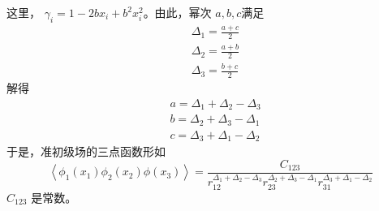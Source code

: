这里， $\gamma_{i}=1-2 b x_{i}+b^{2} x_{i}^{2} $。由此，幂次 $a,b,c $满足
\begin{align} &\Delta_{1}=\frac{a+c}{2}\\ &\Delta_{2}=\frac{a+b}{2}\\ &\Delta_{3}=\frac{b+c}{2} \end{align}
解得
\begin{align} &a=\Delta_{1}+\Delta_{2}-\Delta_{3}\\ &b=\Delta_{2}+\Delta_{3}-\Delta_{1}\\ &c=\Delta_{3}+\Delta_{1}-\Delta_{2}\end{align}
于是，准初级场的三点函数形如
\begin{equation}
	\left\langle\phi_{1}\left(x_{1}\right) \phi_{2}\left(x_{2}\right) \phi\left(x_{3}\right)\right\rangle=\frac{C_{123}}{r_{12}^{\Delta_{1}+\Delta_{2}-\Delta_{3}} r_{23}^{\Delta_{2}+\Delta_{3}-\Delta_{1}} r_{31}^{\Delta_{3}+\Delta_{1}-\Delta_{2}}}
\end{equation}
$C_{123}$ 是常数。

